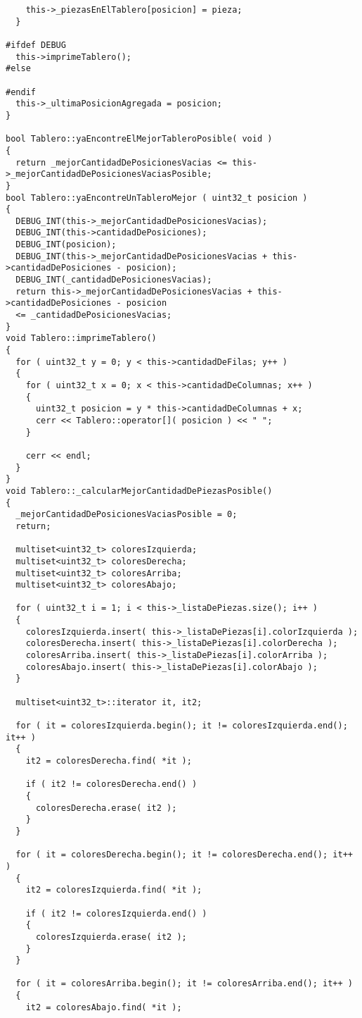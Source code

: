 \documentclass[11pt, a4paper, twoside]{article}
\begin{document}
\begin{lstlisting}
    this->_piezasEnElTablero[posicion] = pieza;
  }

#ifdef DEBUG
  this->imprimeTablero();
#else

#endif
  this->_ultimaPosicionAgregada = posicion;
}

bool Tablero::yaEncontreElMejorTableroPosible( void )
{
  return _mejorCantidadDePosicionesVacias <= this->_mejorCantidadDePosicionesVaciasPosible;
}
bool Tablero::yaEncontreUnTableroMejor ( uint32_t posicion )
{
  DEBUG_INT(this->_mejorCantidadDePosicionesVacias);
  DEBUG_INT(this->cantidadDePosiciones);
  DEBUG_INT(posicion);
  DEBUG_INT(this->_mejorCantidadDePosicionesVacias + this->cantidadDePosiciones - posicion);
  DEBUG_INT(_cantidadDePosicionesVacias);
  return this->_mejorCantidadDePosicionesVacias + this->cantidadDePosiciones - posicion
  <= _cantidadDePosicionesVacias;
}
void Tablero::imprimeTablero()
{
  for ( uint32_t y = 0; y < this->cantidadDeFilas; y++ )
  {
    for ( uint32_t x = 0; x < this->cantidadDeColumnas; x++ )
    {
      uint32_t posicion = y * this->cantidadDeColumnas + x;
      cerr << Tablero::operator[]( posicion ) << " ";
    }

    cerr << endl;
  }
}
void Tablero::_calcularMejorCantidadDePiezasPosible()
{
  _mejorCantidadDePosicionesVaciasPosible = 0;
  return;

  multiset<uint32_t> coloresIzquierda;
  multiset<uint32_t> coloresDerecha;
  multiset<uint32_t> coloresArriba;
  multiset<uint32_t> coloresAbajo;

  for ( uint32_t i = 1; i < this->_listaDePiezas.size(); i++ )
  {
    coloresIzquierda.insert( this->_listaDePiezas[i].colorIzquierda );
    coloresDerecha.insert( this->_listaDePiezas[i].colorDerecha );
    coloresArriba.insert( this->_listaDePiezas[i].colorArriba );
    coloresAbajo.insert( this->_listaDePiezas[i].colorAbajo );
  }

  multiset<uint32_t>::iterator it, it2;

  for ( it = coloresIzquierda.begin(); it != coloresIzquierda.end(); it++ )
  {
    it2 = coloresDerecha.find( *it );

    if ( it2 != coloresDerecha.end() )
    {
      coloresDerecha.erase( it2 );
    }
  }

  for ( it = coloresDerecha.begin(); it != coloresDerecha.end(); it++ )
  {
    it2 = coloresIzquierda.find( *it );

    if ( it2 != coloresIzquierda.end() )
    {
      coloresIzquierda.erase( it2 );
    }
  }

  for ( it = coloresArriba.begin(); it != coloresArriba.end(); it++ )
  {
    it2 = coloresAbajo.find( *it );


\end{lstlisting}
\end{document}
